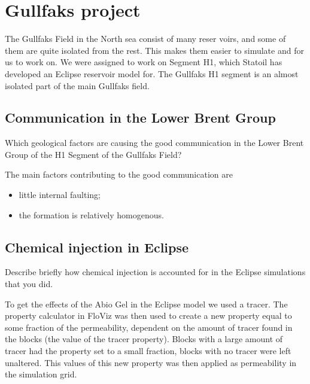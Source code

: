 
\section{Gullfaks project} %
\label{sec:gullfaks_project}
The Gullfaks Field in the North sea consist of many reser voirs, and some of them are quite isolated from the rest. This makes them easier to simulate and for us to work on. We were assigned to work on Segment H1, which Statoil has developed an Eclipse reservoir model for. The Gullfaks H1 segment is an almost isolated part of the main Gullfaks field.

\subsection{Communication in the Lower Brent Group} %
\label{sub:communication_in_the_lower_brent_group}

\begin{question}
  Which geological factors are causing the good communication in the Lower Brent Group of the H1 Segment of the Gullfaks Field?
\end{question}
The main factors contributing to the good communication are
\begin{itemize}
  \item little internal faulting;
  \item the formation is relatively homogenous.
\end{itemize}


\subsection{Chemical injection in Eclipse} %
\label{sub:chemical_injection_in_eclipse}

\begin{question}
  Describe briefly how chemical injection is accounted for in the Eclipse simulations that you did.
\end{question}

To get the effects of the Abio Gel in the Eclipse model we used a tracer. The property calculator in FloViz was then used to create a new property equal to some fraction of the permeability, dependent on the amount of tracer found in the blocks (the value of the tracer property). Blocks with a large amount of tracer had the property set to a small fraction, blocks with no tracer were left unaltered. This values of this new property was then applied as permeability in the simulation grid.


